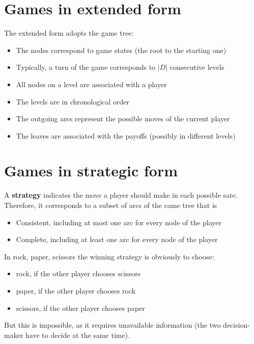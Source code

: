 \section{Games in extended form}
\label{sec:extendedform}

The extended form adopts the game tree:
\begin{itemize}
	\item The nodes correspond to game states (the root to the starting one)
	
	\item Typically, a turn of the game corresponds to $|D|$ consecutive levels
	
	\item All nodes on a level are associated with a player
	
	\item The levels are in chronological order
	
	\item The outgoing arcs represent the possible moves of the current player
	
	\item The leaves are associated with the payoffs (possibly in different levels)
\end{itemize}

\section{Games in strategic form}
\label{sec:stratform}

A \textbf{strategy} indicates the move a player should make in each possible sate. Therefore, it corresponds to a subset of arcs of the came tree that is 
\begin{itemize}
	\item Consistent, including at most one arc for every node of the player
	
	\item Complete, including at least one arc for every node of the player
\end{itemize}

In rock, paper, scissors the winning strategy is obviously to choose:
\begin{itemize}
	\item rock, if the other player chooses scissors
	
	\item paper, if the other player chooses rock
	
	\item scissors, if the other player chooses paper
\end{itemize}
But this is impossible, as it requires unavailable information (the two decision-maker have to decide at the same time).

